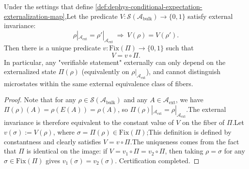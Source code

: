 \begin{proposition}\label{prop:dephys-horizon-sufficiency-zero-knowledge}Under the settings that define \ref{def:dephys-conditional-expectation-externalization-map},Let the predicate \(V:\mathcal{S}(\mathcal{A}_{\mathrm{bulk}})\to\{0,1\}\) satisfy external invariance:\[
\rho|_{\mathcal{A}_{\mathrm{ext}}}=\rho'|_{\mathcal{A}_{\mathrm{ext}}}
\ \Longrightarrow\ 
V(\rho)=V(\rho').
\]
Then there is a unique predicate \(v:\mathrm{Fix}(\Pi)\to\{0,1\}\) such that\begin{equation}\label{eq:dephys-zero-knowledge-factorization-by-Pi}
\boxed{\;
V=v\circ\Pi.\;}
\end{equation}
In particular, any "verifiable statement" externally can only depend on the externalized state \(\Pi(\rho)\) (equivalently on \(\rho|_{\mathcal{A}_{\mathrm{ext}}}\)), and cannot distinguish microstates within the same external equivalence class of fibers.\end{proposition}

\begin{proof}
Note that for any \(\rho\in\mathcal{S}(\mathcal{A}_{\mathrm{bulk}})\) and any \(A\in\mathcal{A}_{\mathrm{ext}}\), we have\(
\Pi(\rho)(A)=\rho(E(A))=\rho(A)
\), so \(\Pi(\rho)|_{\mathcal{A}_{\mathrm{ext}}}=\rho|_{\mathcal{A}_{\mathrm{ext}}}\).The external invariance is therefore equivalent to the constant value of \(V\) on the fiber of \(\Pi\).Let \(v(\sigma):=V(\rho)\), where \(\sigma=\Pi(\rho)\in\mathrm{Fix}(\Pi)\);This definition is defined by constantness and clearly satisfies \(V=v\circ\Pi\).The uniqueness comes from the fact that \(\Pi\) is identical on the image: if \(V=v_1\circ\Pi=v_2\circ\Pi\), then taking \(\rho=\sigma\) for any \(\sigma\in\mathrm{Fix}(\Pi)\) gives \(v_1(\sigma)=v_2(\sigma)\). Certification completed.\end{proof}

